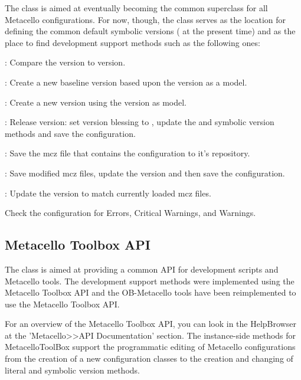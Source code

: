 \documentclass[a4paper,10pt,twoside]{book}
\begin{document}
\begin{code}{}
\begin{code}{}
The  class is aimed at eventually becoming the common superclass for all Metacello configurations. For now, though, the class serves as the location for defining the common default symbolic versions ( at the present time) and as the place to find development support methods such as the following ones:

\begin{description}
\item {}: Compare the  version to  version.
\item {}: Create a new baseline version based upon the  version as a model.
\item {}: Create a new  version using the  version as model.
\item {}: Release  version: set version blessing to , update the  and  symbolic version methods and save the configuration.

\item {}: Save the mcz file that contains the configuration to it's repository.

\item {}: Save modified mcz files, update the  version and then save the configuration.

\item {}: Update the  version to match currently loaded mcz files.

\item {} Check the configuration for Errors, Critical Warnings, and Warnings.
\end{description}

\subsection{Metacello Toolbox API}

The  class is aimed at providing a common API for development scripts and Metacello tools. The development support methods were implemented using the Metacello Toolbox API and the OB-Metacello tools have been reimplemented to use the Metacello Toolbox API.

For an overview of the Metacello Toolbox API, you can look in the HelpBrowser at the 'Metacello>>API Documentation' section. The instance-side methods for MetacelloToolBox support the  programmatic editing of Metacello configurations from the creation of a new configuration classes to the creation and changing of literal and symbolic version methods.


\end{code}
\end{code}
\end{document}
